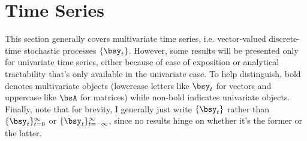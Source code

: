 \documentclass[12pt]{article}
\theoremstyle{plain}
\theoremstyle{definition}
\theoremstyle{remark}
\newcommand{\tinfz}{_{t=0}^\infty}
\begin{document}










\clearpage
\section{Time Series}

This section generally covers multivariate time series, i.e.
vector-valued discrete-time stochastic processes $\{\bsy_t\}$.
However, some results will be presented only for univariate time series,
either because of ease of exposition or analytical tractability that's
only available in the univariate case. To help distinguish, bold denotes
multivariate objects (lowercase letters like $\bsy_t$ for vectors and
uppercase like $\bsA$ for matrices) while non-bold indicates univariate
objects. Finally, note that for brevity, I generally just write $\{\bsy_t\}$ rather
than $\{\bsy_t\}\tinfz$ or $\{\bsy_t\}_{t=-\infty}^{\infty}$,
since no results hinge on whether it's the former or the latter.
\end{document}
